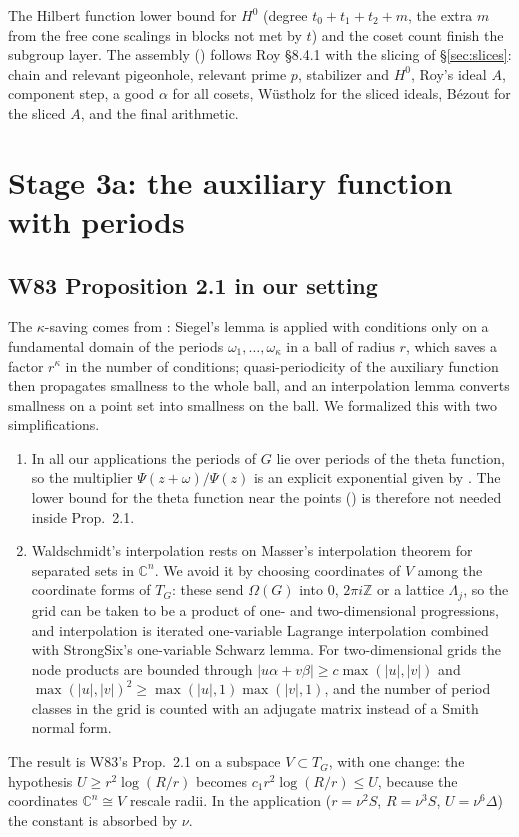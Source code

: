 \documentclass[11pt]{amsart}
\theoremstyle{definition}
\theoremstyle{remark}
\numberwithin{equation}{section}
\newcommand{\ZZ}{\mathbb{Z}}
\newcommand{\CC}{\mathbb{C}}
\begin{document}
The Hilbert function lower bound for $H^0$ (degree $t_0+t_1+t_2+m$, the extra $m$ from the free cone
scalings in blocks not met by $t$) and the coset count finish the subgroup layer. The assembly
() follows Roy \S8.4.1 with the slicing of \S\ref{sec:slices}: chain and relevant
pigeonhole, relevant prime $p$, stabilizer and $H^0$, Roy's ideal $A$, component step, a good $\alpha$ for all
cosets, Wüstholz for the sliced ideals, Bézout for the sliced $A$, and the final arithmetic.

\section{Stage 3a: the auxiliary function with periods}\label{sec:aux}

\subsection{W83 Proposition 2.1 in our setting}
The $\kappa$-saving comes from \cite[Prop.~2.1]{W83}: Siegel's lemma is applied with conditions only
on a fundamental domain of the periods $\omega_1,\dots,\omega_\kappa$ in a ball of radius $r$, which saves
a factor $r^{\kappa}$ in the number of conditions; quasi-periodicity of the auxiliary function then
propagates smallness to the whole ball, and an interpolation lemma converts smallness on a point set
into smallness on the ball. We formalized this with two simplifications.
\begin{enumerate}
\item In all our applications the periods of $G$ lie over periods of the theta function, so the
multiplier $\Psi(z+\omega)/\Psi(z)$ is an explicit exponential given by . The
lower bound for the theta function near the points (\cite[Lemma~2.2]{W83}) is therefore not needed
inside Prop.~2.1.
\item Waldschmidt's interpolation \cite[Lemma~2.3]{W83} rests on Masser's interpolation theorem for
separated sets in $\CC^n$. We avoid it by choosing coordinates of $V$ among the coordinate forms of
$T_G$: these send $\Omega(G)$ into $0$, $2\pi i\ZZ$ or a lattice $\Lambda_j$, so the grid can be taken to be
a product of one- and two-dimensional progressions, and interpolation is iterated one-variable Lagrange
interpolation combined with StrongSix's one-variable Schwarz lemma. For two-dimensional grids the node
products are bounded through $|u\alpha+v\beta|\ge c\max(|u|,|v|)$ and $\max(|u|,|v|)^2\ge\max(|u|,1)\max(|v|,1)$,
and the number of period classes in the grid is counted with an adjugate matrix instead of a Smith
normal form.
\end{enumerate}
The result  is W83's Prop.~2.1 on a subspace $V\subset T_G$, with one change: the
hypothesis $U\ge r^2\log(R/r)$ becomes $c_1r^2\log(R/r)\le U$, because the coordinates $\CC^n\cong V$ rescale
radii. In the application ($r=\nu^2S$, $R=\nu^3S$, $U=\nu^6\Delta$) the constant is absorbed by $\nu$.
\end{document}
